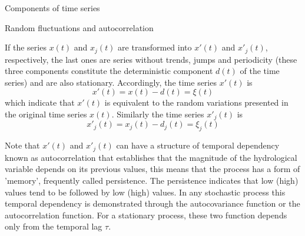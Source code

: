 \documentclass[8pt]{beamer}
\renewcommand{\emph}[1]{\textcolor{myorange}{#1}}
\begin{document}
\begin{frame}{Components of time series}
    \begin{block}{Random fluctuations and autocorrelation}
    \end{block}
    If the series $x(t)$ and $x_j (t)$ are transformed into $x' (t)$ and $x'_j (t)$, respectively, the last ones are series without \emph{trends}, \emph{jumps} and \emph{periodicity} (these three components constitute the deterministic component $d(t)$ of the time series) and are also \emph{stationary}. Accordingly, the time series $x'(t)$ is
    \[
        x'(t) = x(t)-d (t) = \xi (t)
    \]
    which indicate that $x' (t)$ is equivalent to the random variations presented in the original time series $x (t)$. Similarly the time series $x'_j (t)$ is
    \[
        x'_j (t) = x_j (t)-d_j (t) = \xi_j (t)
    \]

    Note that $x' (t)$ and $x'_j (t)$ can have a structure of \emph{temporal dependency} known as \alert{autocorrelation} that establishes that the magnitude of the hydrological variable depends on its previous values, this means that the process has a form of \alert{'memory'}, frequently called \alert{persistence}. The \emph{persistence} indicates that low (high) values tend to be followed by low (high) values. In any \emph{stochastic process} this temporal dependency is demonstrated through the \emph{autocovariance function} or the \emph{autocorrelation function}. For a \emph{stationary} process, these two function depends only from the temporal lag $\tau$. 
\end{frame}
\end{document}

